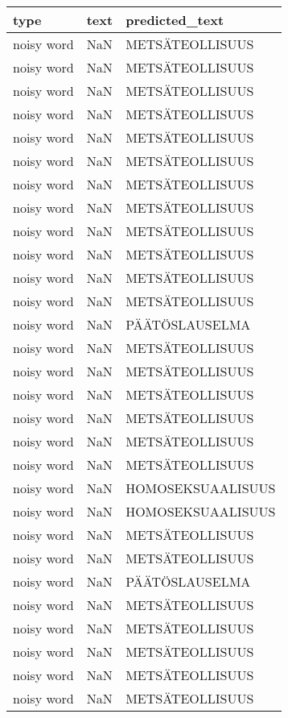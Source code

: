 \begin{tabular}{lll}
\toprule
       type & text &        predicted\_text \\
\midrule
 noisy word &  NaN &       METSÄTEOLLISUUS \\
 noisy word &  NaN &       METSÄTEOLLISUUS \\
 noisy word &  NaN &       METSÄTEOLLISUUS \\
 noisy word &  NaN &       METSÄTEOLLISUUS \\
 noisy word &  NaN &       METSÄTEOLLISUUS \\
 noisy word &  NaN &       METSÄTEOLLISUUS \\
 noisy word &  NaN &       METSÄTEOLLISUUS \\
 noisy word &  NaN &       METSÄTEOLLISUUS \\
 noisy word &  NaN &       METSÄTEOLLISUUS \\
 noisy word &  NaN &       METSÄTEOLLISUUS \\
 noisy word &  NaN &       METSÄTEOLLISUUS \\
 noisy word &  NaN &       METSÄTEOLLISUUS \\
 noisy word &  NaN &        PÄÄTÖSLAUSELMA \\
 noisy word &  NaN &       METSÄTEOLLISUUS \\
 noisy word &  NaN &       METSÄTEOLLISUUS \\
 noisy word &  NaN &       METSÄTEOLLISUUS \\
 noisy word &  NaN &       METSÄTEOLLISUUS \\
 noisy word &  NaN &       METSÄTEOLLISUUS \\
 noisy word &  NaN &       METSÄTEOLLISUUS \\
 noisy word &  NaN &     HOMOSEKSUAALISUUS \\
 noisy word &  NaN &     HOMOSEKSUAALISUUS \\
 noisy word &  NaN &       METSÄTEOLLISUUS \\
 noisy word &  NaN &       METSÄTEOLLISUUS \\
 noisy word &  NaN &        PÄÄTÖSLAUSELMA \\
 noisy word &  NaN &       METSÄTEOLLISUUS \\
 noisy word &  NaN &       METSÄTEOLLISUUS \\
 noisy word &  NaN &       METSÄTEOLLISUUS \\
 noisy word &  NaN &       METSÄTEOLLISUUS \\
 noisy word &  NaN &       METSÄTEOLLISUUS \\

\end{tabular}
